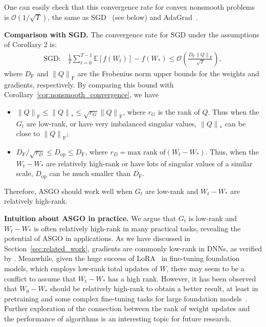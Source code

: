 \documentclass{article}
\theoremstyle{remark}
\newcommand{\Norm}[1]{\left\|#1\right\|}
\newcommand{\EE}{\mathbb{E}}
\newcommand{\cO}{\mathcal{O}}
\begin{document}
One can easily check that this convergence rate for convex nonsmooth problems is $\cO(1/\sqrt{T})$, the same as SGD~\citep{zinkevich2003online} (see below) and AdaGrad~\citep{duchi2011adaptive}.

\textbf{Comparison with SGD.} The convergence rate for SGD under the assumptions of Corollary 2 is:
    \begin{align*}
        \text{SGD:} \quad \frac{1}{T} \sum_{t=0}^{T-1} \EE[f(W_t)] - f(W_*) \le \cO\left( \frac{D_{\mathrm{F}} \Norm{Q}_{\mathrm{F}}}{\sqrt{T}} \right) ,
    \end{align*}
    where $D_{\mathrm{F}}$ and $\Norm{Q}_{\mathrm{F}}$ are the Frobenius norm upper bounds for the weights and gradients, respectively. By comparing this bound with Corollary~\ref{cor:nonsmooth_convergence}, we have
    \begin{itemize}[leftmargin=*]
        \item $\Norm{Q}_{\mathrm{F}} \le \Norm{Q}_* \le \sqrt{r_G} \Norm{Q}_{\mathrm{F}} $, where $r_G$ is the rank of $Q$. Thus when 
        the
        $G_t$ are low-rank, or have very imbalanced singular values, $\Norm{Q}_*$ can be close to $\Norm{Q}_{\mathrm{F}}$;
        \item $D_{\mathrm{F}}/\sqrt{r_D} \le D_{\mathrm{op}} \le D_{\mathrm{F}}$, where $r_D = \text{max rank of} (W_t - W_*)$. Thus, when 
        the
        $W_t - W_*$ are relatively high-rank or have lots of singular values of a similar scale, $D_{\mathrm{op}}$ can be much smaller than $D_{\mathrm{F}}$.
    \end{itemize}
    Therefore, ASGO should work well when $G_t$ are low-rank and $W_t - W_*$ are relatively high-rank.
    
\textbf{Intuition about ASGO in practice.}
We argue that 
$G_t$ is low-rank 
and 
$W_t - W_*$ is often
relatively high-rank 
in many practical tasks, revealing the potential of ASGO in applications. As we have discussed in Section~\ref{sec:related_work}, gradients are commonly low-rank in DNNs, as verified by \citet{zhao2021zero,yang2023spectral,cosson2023low}. Meanwhile, given the huge success of LoRA~\citep{hu2022lora} in fine-tuning foundation models, which 
employs
low-rank total updates of
$W$, there may seem to be a conflict to assume that $W_t - W_*$ has a high rank. However, it has been observed that $W_0 - W_*$ should be relatively high-rank to obtain a better result, at least in pretraining and some complex fine-tuning tasks for large foundation models~\citep{lialin2023relora,jiang2024mora,huang2025hira}. Further exploration of the connection between the rank of weight updates and the performance of algorithms is an interesting topic for future research.
\end{document}
